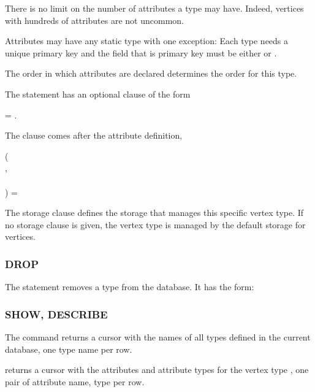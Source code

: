 There is no limit on the number of attributes
a type may have. Indeed, vertices with hundreds
of attributes are not uncommon.

Attributes may have any static type with one exception:
Each type needs a unique primary key and the field
that is primary key must be either
 or .

The order in which attributes are declared
determines the  order for this type.

The  statement has an optional
 clause of the form

 = .

The  clause comes after the
attribute definition, \eg\

\begin{minipage}{\textwidth}
  ( \\
\hspace*{1cm}  , \\
\hspace*{1cm}  \\
)  = 
\end{minipage}

The storage clause defines the storage
that manages this specific vertex type.
If no storage clause is given, the vertex type
is managed by the default storage for vertices.

\subsubsection{DROP}
The  statement removes a type
from the database.
It has the form:

 

\subsubsection{SHOW, DESCRIBE}
The command 
returns a cursor with the names of all
types defined in the current database,
one type name per row.

 
returns a cursor with the attributes
and attribute types for the vertex type
, one pair of
attribute name, type per row.

